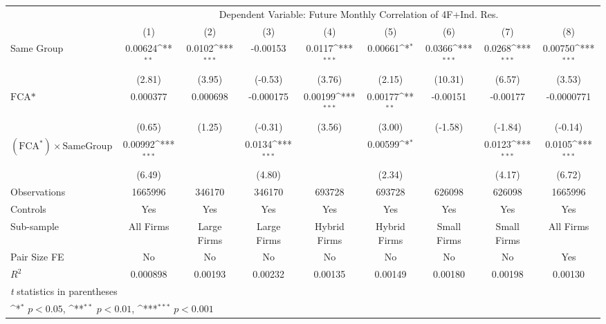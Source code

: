 {
\def\sym#1{\ifmmode^{#1}\else\(^{#1}\)\fi}
\begin{tabular}{l*{8}{c}}
\hline\hline
                &\multicolumn{8}{c}{Dependent Variable: Future Monthly Correlation of 4F+Ind. Res.}                                                                     \\\cmidrule(lr){2-9}
                &\multicolumn{1}{c}{(1)}         &\multicolumn{1}{c}{(2)}         &\multicolumn{1}{c}{(3)}         &\multicolumn{1}{c}{(4)}         &\multicolumn{1}{c}{(5)}         &\multicolumn{1}{c}{(6)}         &\multicolumn{1}{c}{(7)}         &\multicolumn{1}{c}{(8)}         \\
\hline
Same Group      &  0.00624\sym{**} &   0.0102\sym{***}& -0.00153         &   0.0117\sym{***}&  0.00661\sym{*}  &   0.0366\sym{***}&   0.0268\sym{***}&  0.00750\sym{***}\\
                &   (2.81)         &   (3.95)         &  (-0.53)         &   (3.76)         &   (2.15)         &  (10.31)         &   (6.57)         &   (3.53)         \\
[1em]
$ \text{FCA*} $ & 0.000377         & 0.000698         &-0.000175         &  0.00199\sym{***}&  0.00177\sym{**} & -0.00151         & -0.00177         &-0.0000771         \\
                &   (0.65)         &   (1.25)         &  (-0.31)         &   (3.56)         &   (3.00)         &  (-1.58)         &  (-1.84)         &  (-0.14)         \\
[1em]
 $ (\text{FCA}^*) \times {\text{SameGroup} }  $ &  0.00992\sym{***}&                  &   0.0134\sym{***}&                  &  0.00599\sym{*}  &                  &   0.0123\sym{***}&   0.0105\sym{***}\\
                &   (6.49)         &                  &   (4.80)         &                  &   (2.34)         &                  &   (4.17)         &   (6.72)         \\
\hline
Observations    &  1665996         &   346170         &   346170         &   693728         &   693728         &   626098         &   626098         &  1665996         \\
Controls        &      Yes         &      Yes         &      Yes         &      Yes         &      Yes         &      Yes         &      Yes         &      Yes         \\
Sub-sample      &All Firms         &Large Firms         &Large Firms         &Hybrid Firms         &Hybrid Firms         &Small Firms         &Small Firms         &All Firms         \\
Pair Size FE    &       No         &       No         &       No         &       No         &       No         &       No         &       No         &      Yes         \\
$ R^2 $         & 0.000898         &  0.00193         &  0.00232         &  0.00135         &  0.00149         &  0.00180         &  0.00198         &  0.00130         \\
\hline\hline
\multicolumn{9}{l}{\footnotesize \textit{t} statistics in parentheses}\\
\multicolumn{9}{l}{\footnotesize \sym{*} \(p<0.05\), \sym{**} \(p<0.01\), \sym{***} \(p<0.001\)}\\
\end{tabular}
}

